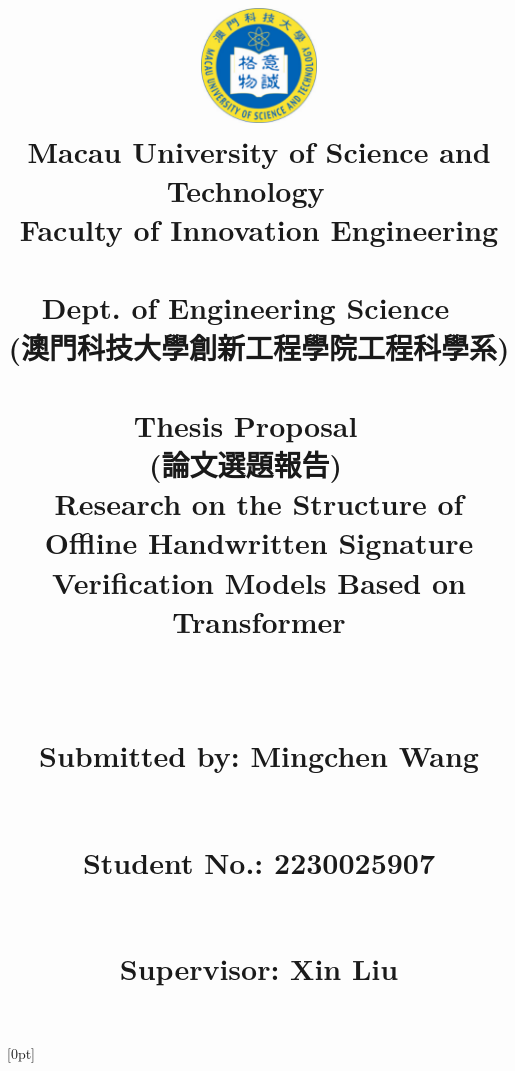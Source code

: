 \documentclass{article}
\begin{document}
\title{\includegraphics[width=1.2in]{figure/MUST.png}\\[-2pt]\huge Macau University of Science and Technology
	~\\
	Faculty of Innovation Engineering
	~\\
	Dept. of Engineering Science
	~\\
	\LARGE{(澳門科技大學創新工程學院工程科學系)}
	~\\[40pt]

	Thesis Proposal
	~\\
	(論文選題報告)
	~\\[40pt]

	\textbf{\LARGE Research on the Structure of Offline Handwritten Signature Verification Models Based on Transformer}

	\title{}

	~\\[50pt]





	\large{

		Submitted by: Mingchen Wang


		~\\[1pt]

		Student No.: 2230025907

		~\\[1pt]

		Supervisor: Xin Liu}

}

\author{}

\date{}


[0pt]{\addvspace{5pt}\filright}
{\contentspush{\thecontentslabel\
	}}
{}{\contentspage}


\maketitle
\thispagestyle{empty}

\clearpage
\end{document}
